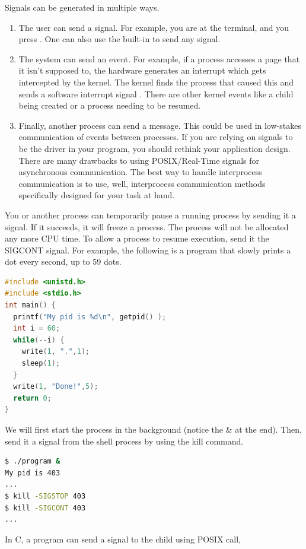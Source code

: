 Signals can be generated in multiple ways.
\begin{enumerate}
\item The user can send a signal.
  For example, you are at the terminal, and you press .
  One can also use the built-in  to send any signal.
\item The system can send an event.
For example, if a process accesses a page that it isn't supposed to, the hardware generates an interrupt which gets intercepted by the kernel.
The kernel finds the process that caused this and sends a software interrupt signal .
There are other kernel events like a child being created or a process needing to be resumed.

\item Finally, another process can send a message.
  This could be used in low-stakes communication of events between processes.
  If you are relying on signals to be the driver in your program, you should rethink your application design.
  There are many drawbacks to using POSIX/Real-Time signals for asynchronous communication.
  The best way to handle interprocess communication is to use, well, interprocess communication methods specifically designed for your task at hand.
\end{enumerate}

You or another process can temporarily pause a running process by sending it a  signal.
If it succeeds, it will freeze a process.
The process will not be allocated any more CPU time.
To allow a process to resume execution, send it the SIGCONT signal.
For example, the following is a program that slowly prints a dot every second, up to 59 dots.

\begin{lstlisting}[language=C]
#include <unistd.h>
#include <stdio.h>
int main() {
  printf("My pid is %d\n", getpid() );
  int i = 60;
  while(--i) {
    write(1, ".",1);
    sleep(1);
  }
  write(1, "Done!",5);
  return 0;
}
\end{lstlisting}

We will first start the process in the background (notice the \& at the end).
Then, send it a signal from the shell process by using the kill command.

\begin{lstlisting}[language=bash]
$ ./program &
My pid is 403
...
$ kill -SIGSTOP 403
$ kill -SIGCONT 403
...
\end{lstlisting}

In C, a program can send a signal to the child using  POSIX call,

